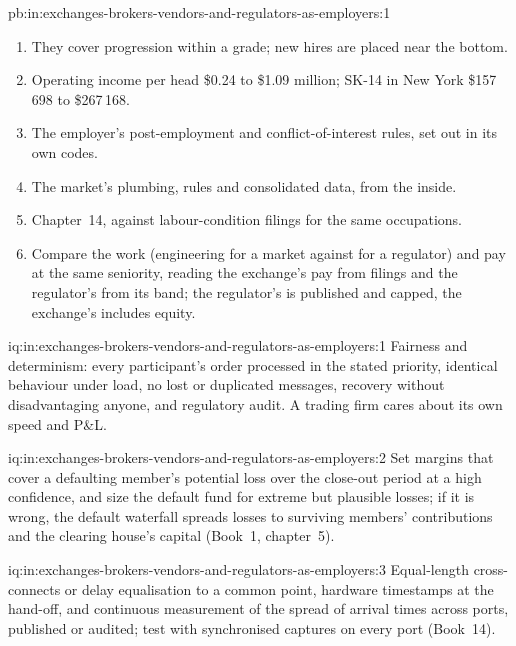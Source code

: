 \begin{solution}{pb:in:exchanges-brokers-vendors-and-regulators-as-employers:1}
\begin{enumerate}
\item They cover progression within a grade; new hires are placed near the bottom.
\item Operating income per head \$0.24 to \$1.09 million; SK-14 in New York \$157\,698 to \$267\,168.
\item The employer's post-employment and conflict-of-interest rules, set out in its own codes.
\item The market's plumbing, rules and consolidated data, from the inside.
\item Chapter~14, against labour-condition filings for the same occupations.
\item Compare the work (engineering for a market against for a regulator) and pay at the same seniority, reading the
exchange's pay from filings and the regulator's from its band; the regulator's is published and capped, the exchange's
includes equity.
\end{enumerate}
\end{solution}

\begin{solution}{iq:in:exchanges-brokers-vendors-and-regulators-as-employers:1}
Fairness and determinism: every participant's order processed in the stated priority, identical behaviour under load, no
lost or duplicated messages, recovery without disadvantaging anyone, and regulatory audit. A trading firm cares about its
own speed and P\&L.
\end{solution}

\begin{solution}{iq:in:exchanges-brokers-vendors-and-regulators-as-employers:2}
Set margins that cover a defaulting member's potential loss over the close-out period at a high confidence, and size
the default fund for extreme but plausible losses; if it is wrong, the default waterfall spreads losses to surviving
members' contributions and the clearing house's capital (Book~1, chapter~5).
\end{solution}

\begin{solution}{iq:in:exchanges-brokers-vendors-and-regulators-as-employers:3}
Equal-length cross-connects or delay equalisation to a common point, hardware timestamps at the hand-off, and continuous
measurement of the spread of arrival times across ports, published or audited; test with synchronised captures on every
port (Book~14).
\end{solution}

